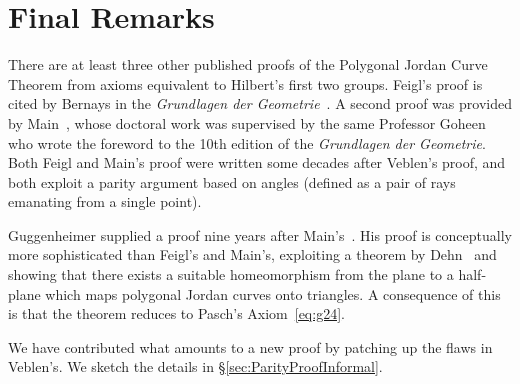 \section{Final Remarks}
There are at least three other published proofs of the Polygonal Jordan Curve Theorem from axioms equivalent to Hilbert's first two groups. Feigl's proof is cited by Bernays in the \emph{Grundlagen der Geometrie}~\cite{FeiglJordan}. A second proof was provided by Main~\cite{MainHilbertGeometry}, whose doctoral work was supervised by the same Professor Goheen who wrote the foreword to the 10th edition of the \emph{Grundlagen der Geometrie}. Both Feigl and Main's proof were written some decades after Veblen's proof, and both exploit a parity argument based on angles (defined as a pair of rays emanating from a single point).

Guggenheimer supplied a proof nine years after Main's~\cite{GuggenheimerJordanProof}. His proof is conceptually more sophisticated than Feigl's and Main's, exploiting a theorem by Dehn~\cite{GuggenheimerJordanCurve} and showing that there exists a suitable homeomorphism from the plane to a half-plane which maps polygonal Jordan curves onto triangles. A consequence of this is that the theorem reduces to Pasch's Axiom~\ref{eq:g24}.

We have contributed what amounts to a new proof by patching up the flaws in Veblen's. We sketch the details in \S\ref{sec:ParityProofInformal}.

